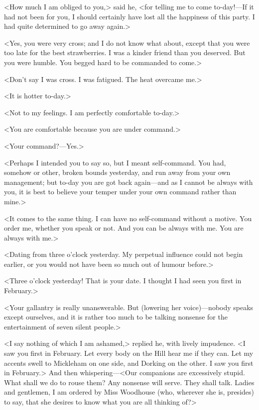 <How much I am obliged to you,> said he, <for telling me to come to-day!—If it had not been for you, I should certainly have lost all the happiness of this party. I had quite determined to go away again.>

<Yes, you were very cross; and I do not know what about, except that you were too late for the best strawberries. I was a kinder friend than you deserved. But you were humble. You begged hard to be commanded to come.>

<Don't say I was cross. I was fatigued. The heat overcame me.>

<It is hotter to-day.>

<Not to my feelings. I am perfectly comfortable to-day.>

<You are comfortable because you are under command.>

<Your command?—Yes.>

<Perhaps I intended you to say so, but I meant self-command. You had, somehow or other, broken bounds yesterday, and run away from your own management; but to-day you are got back again—and as I cannot be always with you, it is best to believe your temper under your own command rather than mine.>

<It comes to the same thing. I can have no self-command without a motive. You order me, whether you speak or not. And you can be always with me. You are always with me.>

<Dating from three o'clock yesterday. My perpetual influence could not begin earlier, or you would not have been so much out of humour before.>

<Three o'clock yesterday! That is your date. I thought I had seen you first in February.>

<Your gallantry is really unanswerable. But (lowering her voice)—nobody speaks except ourselves, and it is rather too much to be talking nonsense for the entertainment of seven silent people.>

<I say nothing of which I am ashamed,> replied he, with lively impudence. <I saw you first in February. Let every body on the Hill hear me if they can. Let my accents swell to Mickleham on one side, and Dorking on the other. I saw you first in February.> And then whispering—<Our companions are excessively stupid. What shall we do to rouse them? Any nonsense will serve. They shall talk. Ladies and gentlemen, I am ordered by Miss Woodhouse (who, wherever she is, presides) to say, that she desires to know what you are all thinking of?>

